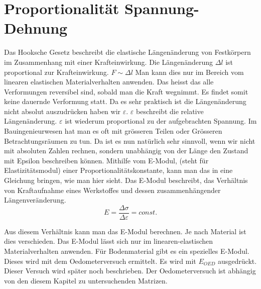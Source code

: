 \section{Proportionalität Spannung-Dehnung\label{spannung:section:Proportionalität Spannung-Dehnung}}
Das Hooksche Gesetz beschreibt die elastische Längenänderung von Festkörpern im Zusammenhang mit einer Krafteinwirkung.
Die Längenänderung $\Delta l$ ist proportional zur Krafteinwirkung.
$F\sim \Delta l$
Man kann dies nur im Bereich vom linearen elastischen Materialverhalten anwenden.
Das heisst das alle Verformungen reversibel sind, sobald man die Kraft wegnimmt.
Es findet somit keine dauernde Verformung statt.
Da es sehr praktisch ist die Längenänderung nicht absolut auszudrücken haben wir $\varepsilon$.
$\varepsilon$ beschreibt die relative Längenänderung.
$\varepsilon$ ist wiederum proportional zu der aufgebrachten Spannung.
Im Bauingenieurwesen hat man es oft mit grösseren Teilen oder Grösseren Betrachtungsräumen zu tun.
Da ist es nun natürlich sehr sinnvoll, wenn wir nicht mit absoluten Zahlen rechnen,
sondern unabhängig von der Länge den Zustand mit Epsilon beschreiben können.
Mithilfe vom E-Modul, (steht für Elastizitätsmodul) einer Proportionalitätskonstante,
kann man das in eine Gleichung bringen, wie man hier sieht. Das E-Modul beschreibt,
das Verhältnis von Kraftaufnahme eines Werkstoffes und dessen zusammenhängender Längenveränderung.
\[
E
=
\frac{\Delta\sigma}{\Delta\varepsilon}
=
const.
\]

Aus diesem Verhältnis kann man das E-Modul berechnen.
Je nach Material ist dies verschieden.
Das E-Modul lässt sich nur im linearen-elastischen Materialverhalten anwenden.
Für Bodenmaterial gibt es ein spezielles E-Modul. Dieses wird mit dem Oedometerversuch ermittelt.
Es wird mit $E_{OED}$ ausgedrückt. Dieser Versuch wird später noch beschrieben.
Der Oedometerversuch ist abhängig von den diesem Kapitel zu untersuchenden Matrizen.



